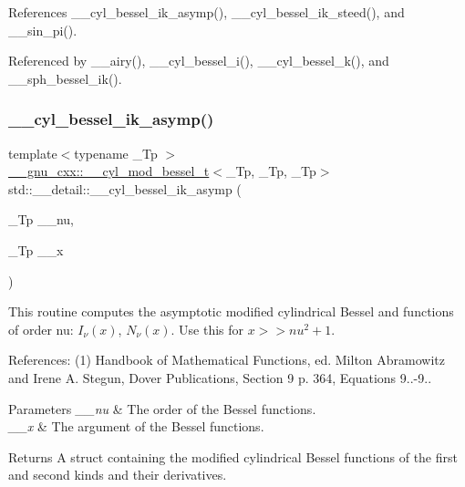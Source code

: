References \+\_\+\+\_\+cyl\+\_\+bessel\+\_\+ik\+\_\+asymp(), \+\_\+\+\_\+cyl\+\_\+bessel\+\_\+ik\+\_\+steed(), and \+\_\+\+\_\+sin\+\_\+pi().



Referenced by \+\_\+\+\_\+airy(), \+\_\+\+\_\+cyl\+\_\+bessel\+\_\+i(), \+\_\+\+\_\+cyl\+\_\+bessel\+\_\+k(), and \+\_\+\+\_\+sph\+\_\+bessel\+\_\+ik().

\mbox{\label{namespacestd_1_1____detail_a9f88b1d2b4158cc854a91a5ae7b4168d}} 
\subsubsection{\texorpdfstring{\+\_\+\+\_\+cyl\+\_\+bessel\+\_\+ik\+\_\+asymp()}{\_\_cyl\_bessel\_ik\_asymp()}}
{\footnotesize\ttfamily template$<$typename \+\_\+\+Tp $>$ \\
\hyperlink{struct____gnu__cxx_1_1____cyl__mod__bessel__t}{\+\_\+\+\_\+gnu\+\_\+cxx\+::\+\_\+\+\_\+cyl\+\_\+mod\+\_\+bessel\+\_\+t}$<$\+\_\+\+Tp, \+\_\+\+Tp, \+\_\+\+Tp$>$ std\+::\+\_\+\+\_\+detail\+::\+\_\+\+\_\+cyl\+\_\+bessel\+\_\+ik\+\_\+asymp (\begin{DoxyParamCaption}\item[{\+\_\+\+Tp}]{\+\_\+\+\_\+nu,  }\item[{\+\_\+\+Tp}]{\+\_\+\+\_\+x }\end{DoxyParamCaption})}



This routine computes the asymptotic modified cylindrical Bessel and functions of order nu\+: $ I_{\nu}(x) $, $ N_{\nu}(x) $. Use this for $ x >> nu^2 + 1 $. 

References\+: (1) Handbook of Mathematical Functions, ed. Milton Abramowitz and Irene A. Stegun, Dover Publications, Section 9 p. 364, Equations 9..-\/9..


\begin{DoxyParams}{Parameters}
{\em \+\_\+\+\_\+nu} & The order of the Bessel functions. \\
\hline
{\em \+\_\+\+\_\+x} & The argument of the Bessel functions. \\
\hline
\end{DoxyParams}
\begin{DoxyReturn}{Returns}
A struct containing the modified cylindrical Bessel functions of the first and second kinds and their derivatives. 
\end{DoxyReturn}



